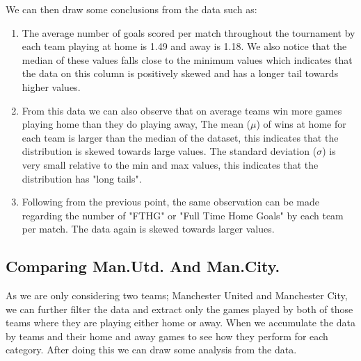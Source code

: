 \documentclass[11pt]{report}
\begin{document}
\noindent
We can then draw some conclusions from the data such as:
\begin{enumerate}
	\item The average number of goals scored per match throughout the tournament by each team playing at home is 1.49 and away is 1.18. We also notice that the median of these values falls close to the minimum values which indicates that the data on this column is positively skewed and has a longer tail towards higher values.
	\item From this data we can also observe that on average teams win more games playing home than they do playing away, The mean ($\mu$) of wins at home for each team is larger than the median of the dataset, this indicates that the distribution is skewed towards large values. The standard deviation ($\sigma$) is very small relative to the min and max values, this indicates that the distribution has "long tails". 
	 \item Following from the previous point, the same observation can be made regarding the number of "FTHG" or "Full Time Home Goals" by each team per match. The data again is skewed towards larger values. 
	 
\end{enumerate}

\subsection{Comparing Man.Utd. And Man.City.}
\noindent
As we are only considering two teams; Manchester United and Manchester City, we can further filter the data and extract only the games played by both of those teams where they are playing either home or away. When we accumulate the data by teams and their home and away games to see how they perform for each category. After doing this we can draw some analysis from the data.

\vspace{0.3cm}
\noindent

\end{document}
